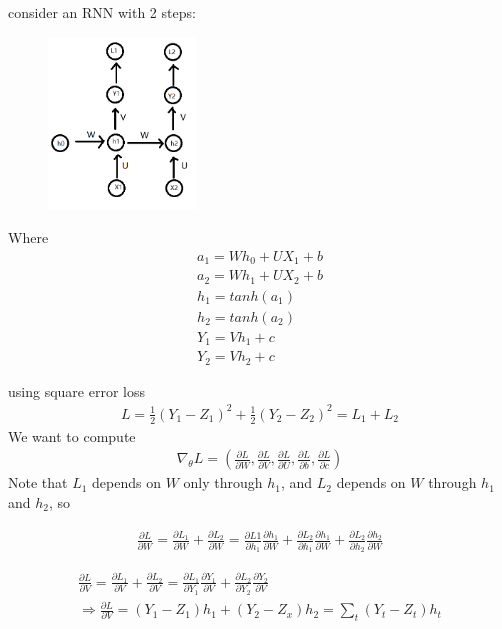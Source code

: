 \begin{example}
consider an RNN with 2 steps:

\begin{figure}[H]
\centering
  \includegraphics[width=0.35\textwidth]{images/Chapter12/RNNbackprograph.png}
\end{figure}

Where 
\begin{align*}
    a_1=Wh_0+UX_1+b\\
    a_2=Wh_1+UX_2+b\\
    h_1=tanh(a_1)\\
    h_2=tanh(a_2)\\
    Y_1=Vh_1+c\\
    Y_2=Vh_2+c
\end{align*}

using square error loss
\begin{align*}
L=\frac{1}{2}(Y_1-Z_1)^2+\frac{1}{2}(Y_2-Z_2)^2=L_1+L_2
\end{align*}
We want to compute
\begin{align*}
\nabla_\theta L=(\frac{\partial L}{\partial W},\frac{\partial L}{\partial V},\frac{\partial L}{\partial U},\frac{\partial L}{\partial b},\frac{\partial L}{\partial c})
\end{align*}Note that $L_1$ depends on $W$ only through $h_1$, and $L_2$ depends on $W$ through $h_1$ and $h_2$, so

\begin{align*}
\frac{\partial L}{\partial W}=\frac{\partial L_1}{\partial W}+\frac{\partial L_2}{\partial W}=\frac{\partial L1}{\partial h_1} \frac{\partial h_1}{\partial W}+\frac{\partial L_2}{\partial h_1} \frac{\partial h_1}{\partial W}+\frac{\partial L_2 }{\partial h_2}\frac{\partial h_2}{\partial W} 
\end{align*}

\begin{align*}
\frac{\partial L}{\partial V}=\frac{\partial L_1}{\partial V}+\frac{\partial L_2}{\partial V}=\frac{\partial L_1}{\partial Y_1}\frac{\partial Y_1}{\partial V}+\frac{\partial L_2}{\partial Y_2}\frac{\partial Y_2}{\partial V} \\
\Rightarrow \frac{\partial L}{\partial V}=(Y_1-Z_1)h_1+(Y_2-Z_x)h_2=\sum_{t}(Y_t-Z_t)h_t\\
\end{align*}


\end{example}

